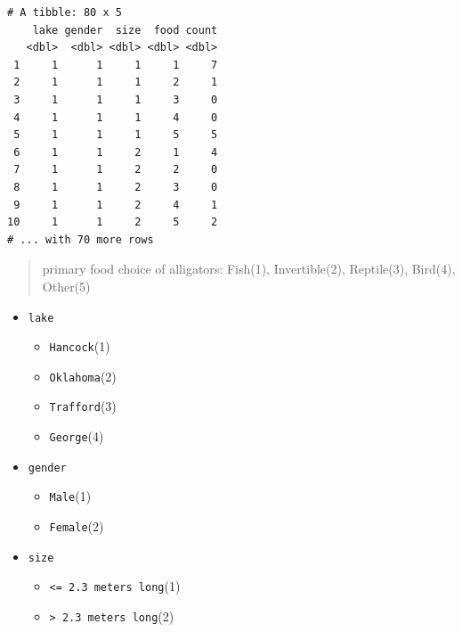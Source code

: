 \documentclass[]{book}
\newenvironment{Shaded}{\begin{snugshade}}{\end{snugshade}}
\newcommand{\DataTypeTok}[1]{\textcolor[rgb]{0.13,0.29,0.53}{#1}}
\newcommand{\KeywordTok}[1]{\textcolor[rgb]{0.13,0.29,0.53}{\textbf{#1}}}
\newcommand{\NormalTok}[1]{#1}
\newcommand{\OperatorTok}[1]{\textcolor[rgb]{0.81,0.36,0.00}{\textbf{#1}}}
\newcommand{\StringTok}[1]{\textcolor[rgb]{0.31,0.60,0.02}{#1}}
\providecommand{\tightlist}{%
  \setlength{\itemsep}{0pt}\setlength{\parskip}{0pt}}
\begin{document}
\begin{verbatim}
# A tibble: 80 x 5
    lake gender  size  food count
   <dbl>  <dbl> <dbl> <dbl> <dbl>
 1     1      1     1     1     7
 2     1      1     1     2     1
 3     1      1     1     3     0
 4     1      1     1     4     0
 5     1      1     1     5     5
 6     1      1     2     1     4
 7     1      1     2     2     0
 8     1      1     2     3     0
 9     1      1     2     4     1
10     1      1     2     5     2
# ... with 70 more rows
\end{verbatim}

\begin{quote}
primary food choice of alligators: Fish(1), Invertible(2), Reptile(3), Bird(4), Other(5)
\end{quote}

\begin{itemize}
\tightlist
\item
  \texttt{lake}

  \begin{itemize}
  \tightlist
  \item
    \texttt{Hancock}(1)
  \item
    \texttt{Oklahoma}(2)
  \item
    \texttt{Trafford}(3)
  \item
    \texttt{George}(4)
  \end{itemize}
\item
  \texttt{gender}

  \begin{itemize}
  \tightlist
  \item
    \texttt{Male}(1)
  \item
    \texttt{Female}(2)
  \end{itemize}
\item
  \texttt{size}

  \begin{itemize}
  \tightlist
  \item
    \texttt{\textless{}=\ 2.3\ meters\ long}(1)
  \item
    \texttt{\textgreater{}\ 2.3\ meters\ long}(2)
  \end{itemize}
\end{itemize}

\begin{Shaded}
\end{Shaded}
\end{document}
